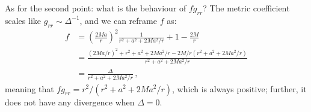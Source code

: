 \documentclass[main.tex]{subfiles}
\begin{document}
As for the second point: what is the behaviour of \(f g_{rr}\)? The metric coefficient scales like \(g_{rr} \sim \Delta^{-1}\), and we can reframe \(f\) as: 
%
\begin{align}
f &= \left(\frac{2Ma}{r}\right)^2 \frac{1}{r^2 + a^2 + 2Ma^2 /r} +1 - \frac{2M}{r}  \\
&= \frac{(2Ma/r)^2 + r^2 +a^2 + 2Ma^2/ r - 2M/r \left(r^2 + a^2 + 2Ma^2 / r\right)}{r^2 + a^2 + 2Ma^2 /r}  \\
&= \frac{\Delta }{r^2 + a^2 + 2Ma^2 /r}
\,,
\end{align}
%
meaning that \(f g_{rr} = r^2 / (r^2 + a^2 + 2Ma^2/r)\), which is always positive; further, it does not have any divergence when \(\Delta = 0\).
\end{document}
